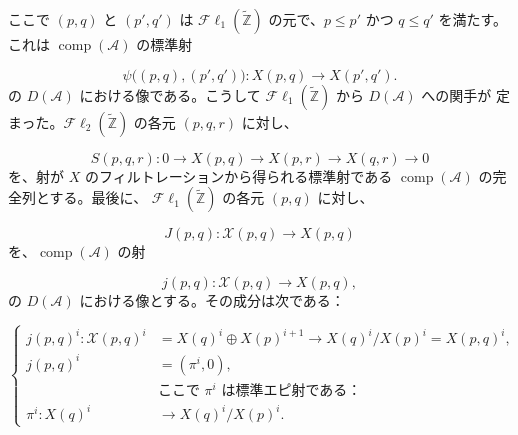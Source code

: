 \clearpage
{}%
\begingroup\small\setlength{\parskip}{0pt}\setlength{\emergencystretch}{1.5em}
\setlength{\abovedisplayskip}{4pt plus 2pt minus 2pt}%
\setlength{\belowdisplayskip}{4pt plus 2pt minus 2pt}%

\noindent ここで $(p,q)$ と $(p',q')$ は
$\mathcal{F}\ell_1(\widetilde{\mathbb Z})$ の元で、$p\leq p'$ かつ
$q\leq q'$ を満たす。これは $\operatorname{comp}(\mathcal A)$ の標準射

\begin{equation}
\psi\bigl((p,q),(p',q')\bigr)\colon
X(p,q)\longrightarrow X(p',q').
\tag{4.2.2.3}
\end{equation}
の $D(\mathcal A)$ における像である。こうして
$\mathcal{F}\ell_1(\widetilde{\mathbb Z})$ から $D(\mathcal A)$ への関手が
定まった。$\mathcal{F}\ell_2(\widetilde{\mathbb Z})$ の各元 $(p,q,r)$ に対し、

\begin{equation}
S(p,q,r)\colon
0\longrightarrow X(p,q)\longrightarrow X(p,r)
\longrightarrow X(q,r)\longrightarrow0
\tag{4.2.2.4}
\end{equation}
を、射が $X$ のフィルトレーションから得られる標準射である
$\operatorname{comp}(\mathcal A)$ の完全列とする。最後に、
$\mathcal{F}\ell_1(\widetilde{\mathbb Z})$ の各元 $(p,q)$ に対し、

\begin{equation}
J(p,q)\colon\mathcal X(p,q)\longrightarrow X(p,q)
\tag{4.2.2.5}
\end{equation}
を、$\operatorname{comp}(\mathcal A)$ の射

\begin{equation}
j(p,q)\colon\mathcal X(p,q)\longrightarrow X(p,q),
\tag{4.2.2.6}
\end{equation}
の $D(\mathcal A)$ における像とする。その成分は次である：

\begin{equation}
\left\{
\begin{aligned}
j(p,q)^i\colon\mathcal X(p,q)^i
 &=X(q)^i\oplus X(p)^{i+1}
   \longrightarrow X(q)^i/X(p)^i=X(p,q)^i,\\
j(p,q)^i&=(\pi^i,0),\\
&\text{ここで $\pi^i$ は標準エピ射である：}\\
\pi^i\colon X(q)^i&\longrightarrow X(q)^i/X(p)^i.
\end{aligned}
\right.
\tag{4.2.2.7}
\end{equation}

